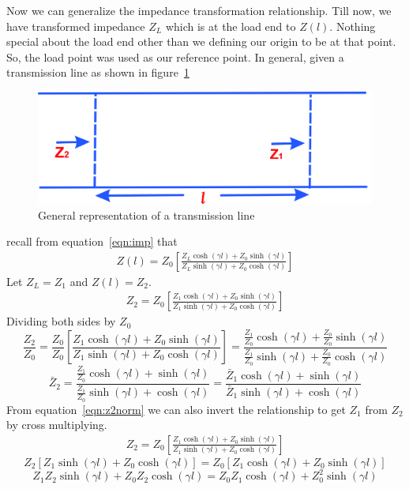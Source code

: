 Now we can generalize the impedance transformation relationship. Till now, we have transformed impedance $Z_L$ which is at the load end to $Z(l)$. Nothing special about the load end other than we defining our origin to be at that point. So, the load point was used as our reference point. In general, given a transmission line as shown in figure~\ref{fig:1234}
\begin{figure}[h]
\centering
\includegraphics[scale=0.45]{./graphics/1234}
\caption{General representation of a transmission line}
\label{fig:1234}
\end{figure}
recall from equation~\eqref{eqn:imp} that
\begin{align*}
Z(l) = Z_0\left[\frac{Z_L\cosh(\gamma l) + Z_0\sinh(\gamma l)}{Z_L\sinh(\gamma l) + Z_0\cosh(\gamma l)}\right]
\end{align*}
Let $Z_L = Z_1$ and $Z(l) = Z_2$.
\begin{align}
Z_2 = Z_0\left[\frac{Z_1\cosh(\gamma l) + Z_0\sinh(\gamma l)}{Z_1 \sinh(\gamma l) + Z_0 \cosh(\gamma l)}\right]
\label{eqn:z2norm}
\end{align}
Dividing both sides by $Z_0$
\begin{dmath*}
\frac{Z_2}{Z_0} = \frac{Z_0}{Z_0} \left[\frac{Z_1\cosh(\gamma l) + Z_0\sinh(\gamma l)}{Z_1 \sinh(\gamma l) + Z_0 \cosh(\gamma l)}\right]
= \frac{\frac{Z_1}{Z_0}\cosh(\gamma l) + \frac{Z_0}{Z_0}\sinh(\gamma l)}{\frac{Z_1}{Z_0}\sinh(\gamma l) + \frac{Z_0}{Z_0}\cosh(\gamma l)}
\end{dmath*}
\begin{dmath*}
\bar{Z}_2 = \frac{\frac{Z_1}{Z_0}\cosh(\gamma l) + \sinh(\gamma l)}{\frac{Z_1}{Z_0}\sinh(\gamma l) + \cosh(\gamma l)}
= \frac{\bar{Z}_1\cosh(\gamma l) + \sinh(\gamma l)}{\bar{Z}_1\sinh(\gamma l) + \cosh(\gamma l)}
\end{dmath*}
From equation~\eqref{eqn:z2norm} we can also invert the relationship to get $Z_1$ from $Z_2$ by cross multiplying.
\begin{align*}
Z_2 = Z_0\left[\frac{Z_1\cosh(\gamma l) + Z_0\sinh(\gamma l)}{Z_1 \sinh(\gamma l) + Z_0 \cosh(\gamma l)}\right]
\end{align*}
\begin{dmath*}
Z_2\left[Z_1\sinh(\gamma l) + Z_0\cosh(\gamma l)\right] = Z_0\left[Z_1\cosh(\gamma l) + Z_0\sinh(\gamma l)\right]
\end{dmath*}
\[Z_1Z_2\sinh(\gamma l) + Z_0Z_2\cosh(\gamma l) = Z_0Z_1\cosh(\gamma l) + Z_0^2\sinh(\gamma l)\]

